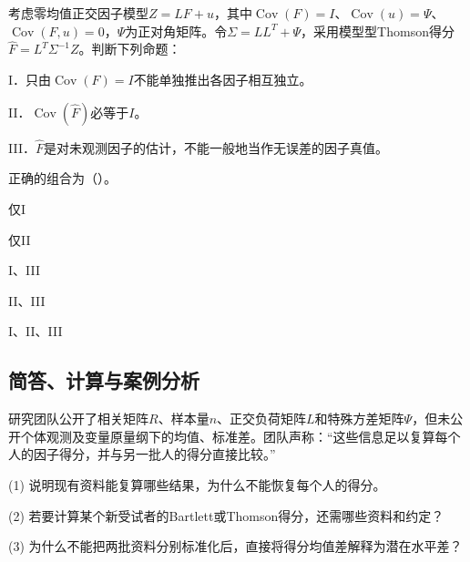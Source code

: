 \par\noindent\begin{minipage}{\linewidth}
考虑零均值正交因子模型$Z=LF+u$，其中$\operatorname{Cov}(F)=I$、$\operatorname{Cov}(u)=\Psi$、$\operatorname{Cov}(F,u)=0$，$\Psi$为正对角矩阵。令$\Sigma=LL^T+\Psi$，采用模型型Thomson得分$\widehat F=L^T\Sigma^{-1}Z$。判断下列命题：\par I．只由$\operatorname{Cov}(F)=I$不能单独推出各因子相互独立。\par II．$\operatorname{Cov}(\widehat F)$必等于$I$。\par III．$\widehat F$是对未观测因子的估计，不能一般地当作无误差的因子真值。\par 正确的组合为（\quad）。
\begin{choices}
\item 仅I
\item 仅II
\item I、III
\item II、III
\item I、II、III
\end{choices}
\end{minipage}\par\medskip

\subsection{简答、计算与案例分析}

研究团队公开了相关矩阵$R$、样本量$n$、正交负荷矩阵$L$和特殊方差矩阵$\Psi$，但未公开个体观测及变量原量纲下的均值、标准差。团队声称：“这些信息足以复算每个人的因子得分，并与另一批人的得分直接比较。”\par (1) 说明现有资料能复算哪些结果，为什么不能恢复每个人的得分。\par (2) 若要计算某个新受试者的Bartlett或Thomson得分，还需哪些资料和约定？\par (3) 为什么不能把两批资料分别标准化后，直接将得分均值差解释为潜在水平差？

